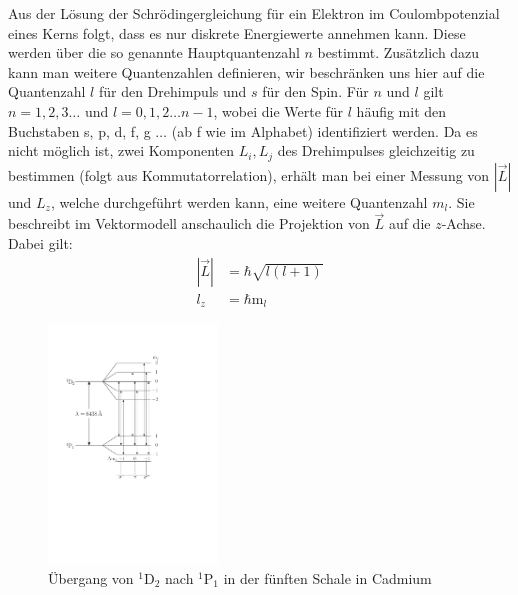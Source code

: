 \documentclass[11pt, a4paper]{article}
\begin{document}
Aus der Lösung der Schrödingergleichung für ein Elektron im Coulombpotenzial eines Kerns folgt, dass es nur diskrete Energiewerte annehmen kann.
Diese werden über die so genannte Hauptquantenzahl $n$ bestimmt.
Zusätzlich dazu kann man weitere Quantenzahlen definieren, wir beschränken uns hier auf die Quantenzahl $l$ für den Drehimpuls und $s$ für den Spin.
Für $n$ und $l$ gilt $n=1, 2, 3 \dots$ und $l=0, 1, 2 \dots n-1$, wobei die Werte für $l$ häufig mit den Buchstaben s, p, d, f, g $\dots$ (ab f wie im Alphabet) identifiziert werden.
Da es nicht möglich ist, zwei Komponenten $L_i, L_j$ des Drehimpulses gleichzeitig zu bestimmen (folgt aus Kommutatorrelation), erhält man bei einer Messung von $|\vec{L}|$ und $L_z$, welche durchgeführt werden kann, eine weitere Quantenzahl $m_l$. Sie beschreibt im Vektormodell anschaulich die Projektion von $\vec{L}$ auf die $z$-Achse.
Dabei gilt:
\begin{align*}
|\vec{L}|&=\hbar\sqrt{l(l+1)}\\
l_z&=\hbar\mathrm{m}_l
\end{align*}

\begin{figure}[h]
\centering
\includegraphics[width=0.4\textwidth]{./figures/termschema_cadmium.pdf}
\caption{Übergang von $^1$D$_2$ nach $^1$P$_1$ in der fünften Schale in Cadmium}
\label{fig:termschema_cadmium}
\end{figure}
\end{document}
